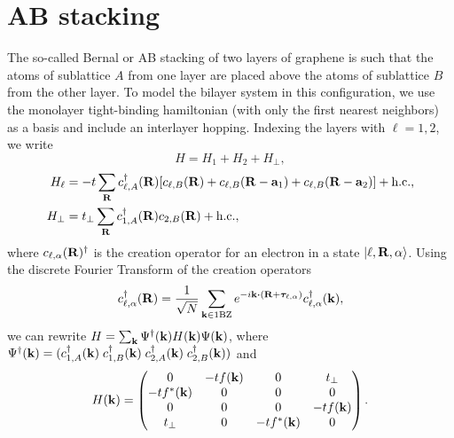 \section{AB stacking}

The so-called Bernal or AB stacking of two layers of graphene is such that the atoms of sublattice $A$ from one layer are placed above the atoms of sublattice $B$ from the other layer.
To model the bilayer system in this configuration, we use the monolayer tight-binding hamiltonian (with only the first
nearest neighbors) as a basis and include an interlayer hopping. Indexing the layers with $\ell = 1, 2$, we write
\begin{equation} \label{eq:ab-hamil}
H = H_1 + H_2 + H_{\perp},
\end{equation}
\begin{equation} \label{eq:ab-slg-hamil}
\begin{split}
H_\ell &= -t \sum_{{\vb{R}}} c_{\ell,A}^{\dagger}({\vb{R}}) [c_{\ell,B}({\vb{R}}) + c_{\ell,B}({\vb{R}}-{\vb{a}}_1) + c_{\ell,B}({\vb{R}}-{\vb{a}}_2)] + {\text{h.c.}}, \\
H_\perp &= t_{\perp} \sum_{{\vb{R}}} c_{1,A}^{\dagger}({\vb{R}}) c_{2,B}({\vb{R}}) + {\text{h.c.}},
\end{split}
\end{equation}
where $c_{\ell,\alpha}({\vb{R}})^{\dagger}$ is the creation operator for an electron in a state $\ket{\ell,{\vb{R}},\alpha}$. Using the discrete Fourier Transform of the creation operators
\begin{equation} \label{eq:ft-creatio}
c_{\ell,\alpha}^\d(\R) = \frac{1}{\sqrt{N}} \sum_{\k\in\text{1BZ}} e^{-i\k\vdot(\R+\bm{\tau}_{\ell,\alpha})} c_{\ell,\alpha}^\d(\k),
\end{equation}
we can rewrite $H = \sum_{{\vb{k}}} \Psi^{\dagger}({\vb{k}}) H({\vb{k}}) \Psi({\vb{k}})$, where $\Psi^{\dagger}({\vb{k}}) = (c_{1,A}^{\dagger}({\vb{k}}) \; c_{1,B}^{\dagger}({\vb{k}}) \; c_{2,A}^{\dagger}({\vb{k}}) \; c_{2,B}^{\dagger}({\vb{k}}))$ and
\begin{equation} \label{eq:ab-momentum_space}
H({\vb{k}}) =
\begin{pmatrix}
0 & -t f({\vb{k}}) & 0 & t_\perp \\
-t f^*({\vb{k}}) & 0 & 0 & 0 \\
0 & 0 & 0 & -t f({\vb{k}}) \\
t_\perp & 0 & -t f^*({\vb{k}}) & 0 \\
\end{pmatrix}.
\end{equation}

